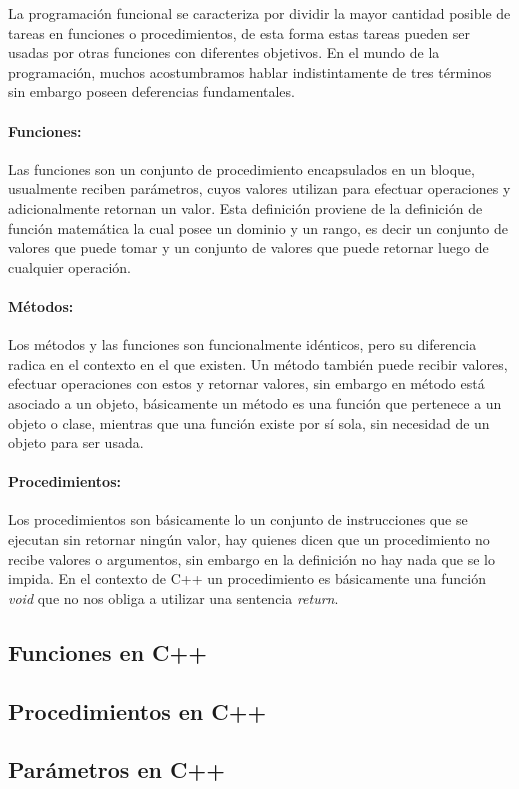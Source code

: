 La programación funcional se caracteriza por dividir la mayor cantidad posible de tareas en funciones o procedimientos, de esta forma estas tareas pueden ser usadas por otras funciones con diferentes objetivos. En el mundo de la programación, muchos acostumbramos hablar indistintamente de tres términos sin embargo poseen deferencias fundamentales.

\paragraph{Funciones:} Las funciones son un conjunto de procedimiento encapsulados en un bloque, usualmente reciben parámetros, cuyos valores utilizan para efectuar operaciones y adicionalmente retornan un valor. Esta definición proviene de la definición de función matemática la cual posee un dominio y un rango, es decir un conjunto de valores que puede tomar y un conjunto de valores que puede retornar luego de cualquier operación.

\paragraph{Métodos:} Los métodos y las funciones son funcionalmente idénticos, pero su diferencia radica en el contexto en el que existen. Un método también puede recibir valores, efectuar operaciones con estos y retornar valores, sin embargo en método está asociado a un objeto, básicamente un método es una función que pertenece a un objeto o clase, mientras que una función existe por sí sola, sin necesidad de un objeto para ser usada.

\paragraph{Procedimientos:} Los procedimientos son básicamente lo un conjunto de instrucciones que se ejecutan sin retornar ningún valor, hay quienes dicen que un procedimiento no recibe valores o argumentos, sin embargo en la definición no hay nada que se lo impida. En el contexto de C++ un procedimiento es básicamente una función \emph{void} que no nos obliga a utilizar una sentencia \emph{return}.


\subsection{Funciones en C++}


\subsection{Procedimientos en C++}


\subsection{Parámetros en C++}
